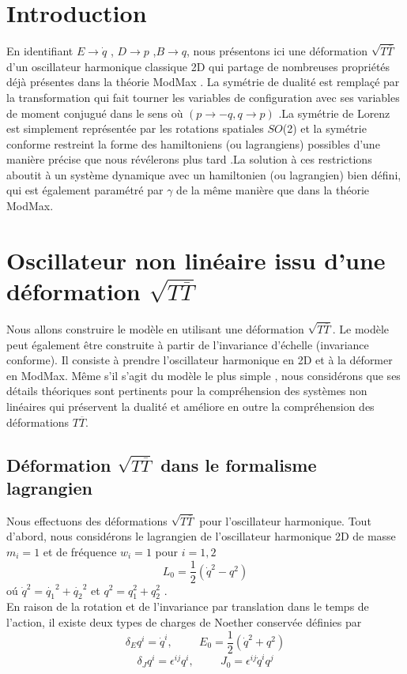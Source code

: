 \documentclass[12pt,a4paper, openany]{report}
\begin{document}
	\section{Introduction}
	En identifiant $E\rightarrow{\dot{q}}$ , $D\rightarrow{p}$ ,$B\rightarrow{q}$, nous présentons ici une déformation $\sqrt{T{\overline{T}}}$ d'un oscillateur harmonique classique 2D qui partage de nombreuses propriétés déjà présentes dans la théorie ModMax . La symétrie de dualité est remplaçé par la transformation qui fait tourner les variables de configuration avec ses variables de moment conjugué dans le sens o\`{u} $\left(p\rightarrow -q,q\rightarrow p\right)$ .La symétrie de Lorenz est simplement représentée par les rotations spatiales $SO$(2) et la symétrie conforme restreint la forme des hamiltoniens (ou lagrangiens) possibles d'une manière précise que nous révélerons plus tard .La solution à ces restrictions aboutit à un système dynamique avec un hamiltonien (ou lagrangien) bien défini, qui est également paramétré par $\gamma$ de la m\^{e}me manière que dans la théorie ModMax.
	
	
	\section{Oscillateur non linéaire issu d'une déformation $\sqrt{T{\overline{T}}}$}
	Nous allons construire le modèle en utilisant une déformation $\sqrt{T{\overline{T}}}$. Le modèle peut également \^{e}tre construite à partir de l'invariance d'échelle (invariance conforme). Il consiste à prendre l'oscillateur harmonique  en 2D et à la déformer en ModMax. M\^{e}me s'il s'agit du modèle le plus simple , nous considérons que ses détails théoriques sont pertinents pour la compréhension des systèmes non linéaires qui préservent la dualité et améliore en outre la compréhension des déformations $T{\overline{T}}$.
	\subsection{Déformation $\sqrt{T{\overline{T}}}$ dans le formalisme lagrangien}
	
	Nous effectuons des déformations $\sqrt{T{\overline{T}}}$ pour l'oscillateur harmonique. Tout d'abord, nous considérons le lagrangien de l'oscillateur harmonique 2D de masse $m_i=1$ et de fréquence $w_i=1$ pour $i=1,2$
	\begin{equation}
		L_0=\frac{1}{2}(\dot{q}^{2}-q^2)
	\end{equation}
	o\'{u} $\dot{q}^{2}=\dot{q_1}^{2}+\dot{q_2}^{2}$  et  $q^2=q^{2}_1+q_2^{2}$
	.\\
	En raison de la rotation et de l'invariance par translation dans le temps de l'action, il existe deux types de charges de Noether conservée définies par 
	\begin{equation}
		\delta_{E}q^i=\dot{q}^{i},\hspace{1cm} E_0=	\frac{1}{2}(\dot{q}^{2}+q^2)
	\end{equation} 
	\begin{equation}
		\delta_{J}q^i=\epsilon^{ij}q^i, \hspace{1cm}J_0=\epsilon^{ij}\dot{q}^{i}q^j
	\end{equation}
	
\end{document}
